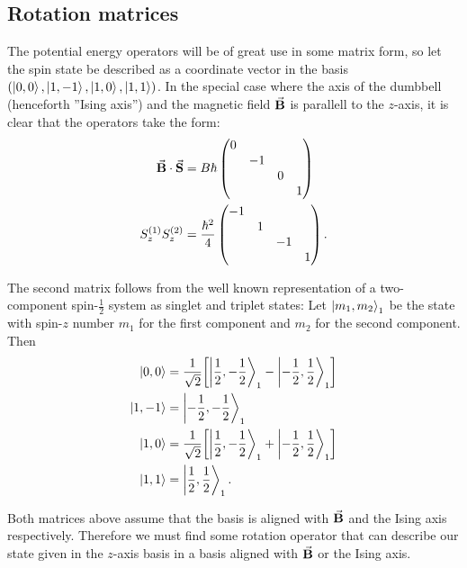 \documentclass[a4paper]{article}
\begin{document}
\subsection{Rotation matrices}
The potential energy operators will be of great use in some matrix form, so let the spin
state be described as a coordinate vector in the basis \((\ket{0, 0}, \ket{1, -1}, \ket{1, 0},
\ket{1, 1})\). In the special case where the axis of the dumbbell (henceforth ''Ising
axis'') and the magnetic field \(\va{B}\) is parallell to the \(z\)-axis, it is clear that the operators take the form:
\begin{align}
        \va{B}\cdot \va{S} &= B\hbar \label{eq:BSmat}
        \begin{pmatrix}
        \dmat{0,-1,0,1}
        \end{pmatrix} \\
        S^{(1)}_{z}S^{(2)}_{z} &= \frac{\hbar^2}{4} \label{eq:SSmat}
        \begin{pmatrix} 
        \diagonalmatrix{-1,1,-1,1}\end{pmatrix} 
.\end{align}

The second matrix follows from the well known representation of a two-component
spin-\(\frac{1}{2}\) system as singlet and triplet states: Let \(\ket{m_1, m_2}_1\) be the
state with spin-\(z\) number \(m_1\) for the first component and \(m_2\) for the second
component. Then
\begin{align*}
    \ket{0, 0} &= \frac{1}{\sqrt{2}}\bqty{\ket{\frac{1}{2}, -\frac{1}{2}}_1 -
                \ket{-\frac{1}{2}, \frac{1}{2}}_1}\\
    \ket{1, -1} &= \ket{-\frac{1}{2}, -\frac{1}{2}}_1\\
    \ket{1, 0} &= \frac{1}{\sqrt{2} }\bqty{\ket{\frac{1}{2}, -\frac{1}{2}}_1 +
            \ket{-\frac{1}{2}, \frac{1}{2}}_1}\\
    \ket{1, 1} &= \ket{\frac{1}{2}, \frac{1}{2}}_1
.\end{align*}

Both matrices above assume that the basis is aligned with \(\va{B}\) and the Ising axis
respectively. Therefore we must find some rotation operator that can describe our state
given in the \(z\)-axis basis in a basis aligned with \(\va{B}\) or the Ising axis.
\end{document}
